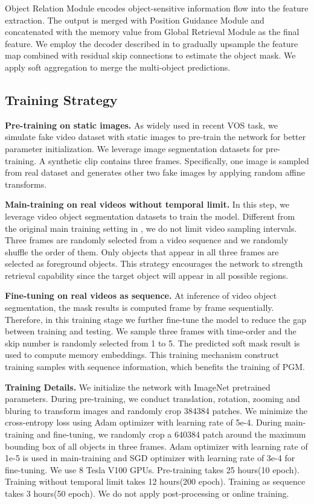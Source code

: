 \documentclass[final]{cvpr}
\begin{document}
Object Relation Module encodes object-sensitive information flow into the feature extraction. The output is merged with Position Guidance Module and concatenated with the memory value from Global Retrieval Module as the final feature. We employ the decoder described in \cite{rgmp,STM} to gradually upsample the feature map combined with residual skip connections to estimate the object mask. We apply soft aggregation\cite{rgmp,STM} to merge the
multi-object predictions. 



\subsection{Training Strategy}\label{sec:train}
\textbf{Pre-training on static images. }
As widely used in recent VOS task\cite{rgmp,STM,KMN}, we simulate fake video dataset with static images to pre-train the network for better parameter initialization. We leverage image segmentation datasets\cite{pre1,pre2,coco} for pre-training. A synthetic clip contains three frames. Specifically, one image is sampled from real dataset and generates other two fake images by applying random affine transforms. 


\textbf{Main-training on real videos without temporal limit. }
In this step, we leverage video object segmentation datasets to train the model. Different from the original main training setting in \cite{STM}, we do not limit video sampling intervals. Three frames are randomly selected from a video sequence and we randomly shuffle the order of them. 
Only objects that appear in all three frames are selected as foreground objects. 
This strategy encourages the network to strength retrieval capability since the target object will appear in all possible regions. 

\textbf{Fine-tuning on real videos as sequence. }
At inference of video object segmentation, the mask results is computed frame by frame sequentially. Therefore, in this training stage we further fine-tune the model to reduce the gap between training and testing. We sample three frames with time-order and the skip number is randomly selected from 1 to 5. The predicted soft mask result is used to compute memory embeddings. This training mechanism construct training samples with sequence information, which benefits the training of PGM.


\textbf{Training Details. }
We initialize the network with ImageNet pretrained parameters. During pre-training, we conduct translation, rotation, zooming and bluring to transform images and randomly crop 384384 patches. We minimize the cross-entropy loss using Adam optimizer with learning rate of 5e-4. During main-training and fine-tuning, we randomly crop a 640384 patch around the maximum bounding box of all objects in three frames. Adam optimizer with learning rate of 1e-5 is used in main-training and SGD optimizer with learning rate of 3e-4 for fine-tuning. We use 8 Tesla V100 GPUs.   Pre-training  takes  25  hours(10  epoch).   Training without temporal limit takes 12 hours(200 epoch). Training as sequence takes 3 hours(50 epoch). We do not apply post-processing or online training. 
\end{document}
